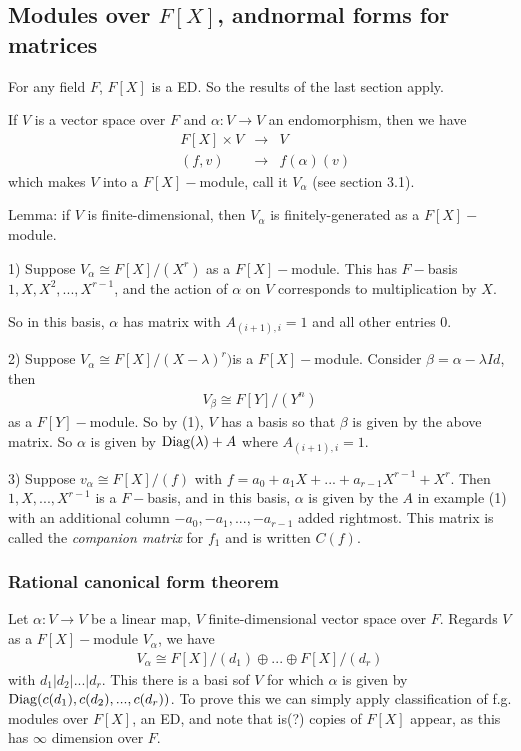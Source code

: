 \documentclass[a4paper]{article}
\begin{document}
\subsection{Modules over $F[X]$, andnormal forms for matrices}
For any field $F$, $F[X]$ is a ED. So the results of the last section apply.

If $V$ is a vector space over $F$ and $\alpha:V \to V$ an endomorphism, then we have
\begin{equation*}
\begin{aligned}
&F[X]\times V &\to &V\\
&(f,v) &\to &f(\alpha)(v)
\end{aligned}
\end{equation*}
which makes $V$ into a $F[X]-$module, call it $V_\alpha$ (see section 3.1).

Lemma: if $V$ is finite-dimensional, then $V_\alpha$ is finitely-generated as a $F[X]-$module.

\begin{eg}
1) Suppose $V_\alpha \cong F[X]/(X^r)$ as a $F[X]-$module. This has $F-$basis $1,X,X^2,...,X^{r-1}$, and the action of $\alpha$ on $V$ corresponds to multiplication by $X$.

So in this basis, $\alpha$ has matrix with $A_{(i+1),i}=1$ and all other entries 0.

2) Suppose $V_\alpha \cong F[X] / (X-\lambda)^r)$is a $F[X]-$module. Consider $\beta = \alpha-\lambda Id$, then
\begin{equation*}
\begin{aligned}
V_\beta \cong F[Y] / (Y^n)
\end{aligned}
\end{equation*}
as a $F[Y]-$module. So by (1), $V$ has a basis so that $\beta$ is given by the above matrix. So $\alpha$ is given by $\operatorname{Diag}(\lambda)+A$ where $A_{(i+1),i}=1$.

3) Suppose $v_\alpha \cong F[X]/(f)$ with $f=a_0+a_1X+...+a_{r-1}X^{r-1}+X^r$. Then $1,X,...,X^{r-1}$ is a $F-$basis, and in this basis, $\alpha$ is given by the $A$ in example (1) with an additional column $-a_0,-a_1,...,-a_{r-1}$ added rightmost. This matrix is called the \emph{companion matrix} for $f_1$ and is written $C(f)$.

\subsubsection{Rational canonical form theorem}
Let $\alpha:V \to V$ be a linear map, $V$ finite-dimensional vector space over $F$. Regards $V$ as a $F[X]-$module $V_\alpha$, we have
\begin{equation*}
\begin{aligned}
V_\alpha \cong F[X]/(d_1) \oplus ... \oplus F[X]/(d_r)
\end{aligned}
\end{equation*}
with $d_1 | d_2 | ... | d_r$. This there is a basi sof $V$ for which $\alpha$ is given by $\operatorname{Diag}(c(d_1),c(d_2),...,c(d_r))$. To prove this we can simply apply classification of f.g. modules over $F[X]$, an ED, and note that is(?) copies of $F[X]$ appear, as this has $\infty$ dimension over $F$.
\end{eg}
\end{document}
